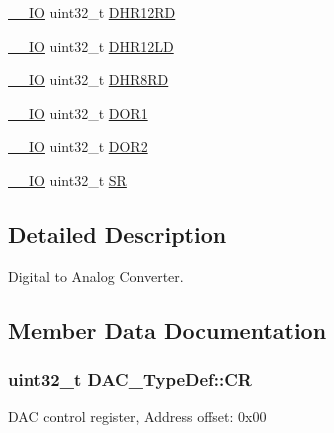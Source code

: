\begin{DoxyCompactItemize}
\item 
\hyperlink{core__sc300_8h_aec43007d9998a0a0e01faede4133d6be}{\+\_\+\+\_\+\+IO} uint32\+\_\+t \hyperlink{struct_d_a_c___type_def_affa5cc9fe0cc9eb594d703bdc9d9abd9}{D\+H\+R12\+RD}
\item 
\hyperlink{core__sc300_8h_aec43007d9998a0a0e01faede4133d6be}{\+\_\+\+\_\+\+IO} uint32\+\_\+t \hyperlink{struct_d_a_c___type_def_aea4d055e3697999b44cdcf2702d79d40}{D\+H\+R12\+LD}
\item 
\hyperlink{core__sc300_8h_aec43007d9998a0a0e01faede4133d6be}{\+\_\+\+\_\+\+IO} uint32\+\_\+t \hyperlink{struct_d_a_c___type_def_a03f8d95bbf0ce3a53cb79506d5bf995a}{D\+H\+R8\+RD}
\item 
\hyperlink{core__sc300_8h_aec43007d9998a0a0e01faede4133d6be}{\+\_\+\+\_\+\+IO} uint32\+\_\+t \hyperlink{struct_d_a_c___type_def_a50b4f0b0d2a376f729c8d7acf47864c3}{D\+O\+R1}
\item 
\hyperlink{core__sc300_8h_aec43007d9998a0a0e01faede4133d6be}{\+\_\+\+\_\+\+IO} uint32\+\_\+t \hyperlink{struct_d_a_c___type_def_a1bde8391647d6422b39ab5ba4f13848b}{D\+O\+R2}
\item 
\hyperlink{core__sc300_8h_aec43007d9998a0a0e01faede4133d6be}{\+\_\+\+\_\+\+IO} uint32\+\_\+t \hyperlink{struct_d_a_c___type_def_a1d3fd83d6ed8b2d90b471db4509b0e70}{SR}
\end{DoxyCompactItemize}


\subsection{Detailed Description}
Digital to Analog Converter. 

\subsection{Member Data Documentation}
\subsubsection[{\texorpdfstring{CR}{CR}}]{ uint32\+\_\+t D\+A\+C\+\_\+\+Type\+Def\+::\+CR}\hypertarget{struct_d_a_c___type_def_a394324f0b573837ca15a87127b2a37ea}{}\label{struct_d_a_c___type_def_a394324f0b573837ca15a87127b2a37ea}
D\+AC control register, Address offset\+: 0x00 
